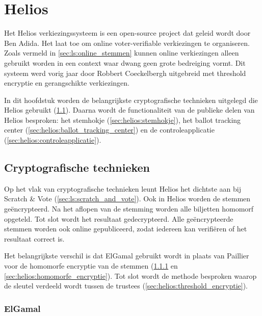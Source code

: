 % 
%

\chapter{Helios}
\label{chap:helios}

Het Helios verkiezingssysteem is een open-source project dat geleid wordt door Ben Adida.\cite{adida_helios} Het laat toe om online voter-verifiable verkiezingen te organiseren. Zoals vermeld in \ref{sec:ls:online_stemmen} kunnen online verkiezingen alleen gebruikt worden in een context waar dwang geen grote bedreiging vormt. Dit systeem werd vorig jaar door Robbert Coeckelbergh uitgebreid met threshold encryptie en gerangschikte verkiezingen.\cite{coeckelbergh_toepassing_en_uitbreiding_van_het_helios_online_verkiezingssysteem} 

\npar In dit hoofdstuk worden de belangrijkste cryptografische technieken uitgelegd die Helios gebruikt (\ref{sec:helios:cryptografische_technieken}). Daarna wordt de functionaliteit van de publieke delen van Helios besproken: het stemhokje (\ref{sec:helios:stemhokje}), het ballot tracking center (\ref{sec:helios:ballot_tracking_center}) en de controleapplicatie (\ref{sec:helios:controleapplicatie}).

\section{Cryptografische technieken}
\label{sec:helios:cryptografische_technieken}

Op het vlak van cryptografische technieken leunt Helios het dichtste aan bij Scratch \& Vote (\ref{sec:ls:scratch_and_vote}). Ook in Helios worden de stemmen ge\"encrypteerd. Na het aflopen van de stemming worden alle biljetten homomorf opgeteld. Tot slot wordt het resultaat gedecrypteerd. Alle ge\"encrypteerde stemmen worden ook online gepubliceerd, zodat iedereen kan verifi\"eren of het resultaat correct is.

\npar Het belangrijkste verschil is dat ElGamal gebruikt wordt in plaats van Paillier voor de homomorfe encryptie van de stemmen (\ref{sec:helios:elgamal} en \ref{sec:helios:homomorfe_encryptie}). Tot slot wordt de methode besproken waarop de sleutel verdeeld wordt tussen de trustees (\ref{sec:helios:threshold_encryptie}).

\subsection[ElGamal]{ElGamal~\cite{elgamal_elgamal}}
\label{sec:helios:elgamal}

